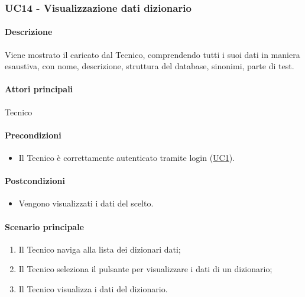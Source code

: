 \subsubsection{UC14 - Visualizzazione dati dizionario}\label{UC14}
\paragraph*{Descrizione} Viene mostrato il  caricato dal Tecnico, comprendendo tutti i suoi dati in maniera esaustiva, con nome, descrizione, struttura del database, sinonimi, parte di test.

\paragraph*{Attori principali} Tecnico

\paragraph*{Precondizioni}
\begin{itemize}
  \item Il Tecnico è correttamente autenticato tramite login (\hyperref[UC1]{UC1}).
\end{itemize}

\paragraph*{Postcondizioni}
\begin{itemize}
  \item Vengono visualizzati i dati del  scelto.
\end{itemize}

\paragraph*{Scenario principale}
\begin{enumerate}
  \item Il Tecnico naviga alla lista dei dizionari dati;
  \item Il Tecnico seleziona il pulsante per visualizzare i dati di un dizionario;
  \item Il Tecnico visualizza i dati del dizionario.
\end{enumerate}

